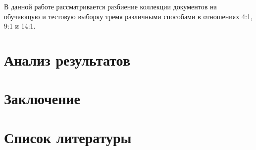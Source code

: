 \documentclass[a4paper]{report}
\begin{document}
	В данной работе рассматривается разбиение коллекции документов на обучающую и тестовую выборку тремя различными способами в отношениях 4:1, 9:1 и 14:1.
	

	
	\newpage
	\section{Анализ результатов}
	
	
	
	
	\newpage
	\section{Заключение}
	
	
	
	
	\newpage
	\section{Список литературы}
	
\end{document}
